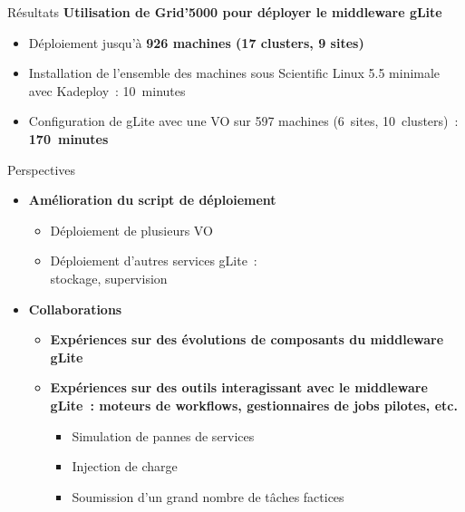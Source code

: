\documentclass[10pt,final,usepdftitle=false,handout]{beamer}
\begin{document}
\begin{frame}{Résultats}
	\textbf{Utilisation de Grid'5000 pour déployer le middleware gLite}
\begin{itemize}
	\item Déploiement jusqu'à \textbf{926 machines (17 clusters, 9 sites)}
		\bigskip
\item Installation de l'ensemble des machines sous Scientific Linux 5.5 minimale avec Kadeploy~: 10~minutes
		\bigskip
\item Configuration de gLite avec une VO sur 597 machines (6~sites, 10~clusters)~: \textbf{170~minutes}
\end{itemize}
	\end{frame}

	\begin{frame}{Perspectives}
	\begin{itemize}
		\item \textbf{Amélioration du script de déploiement}
		\begin{itemize}
		\item Déploiement de plusieurs VO
		\item Déploiement d'autres services gLite~:\\ stockage, supervision
		\bigskip
			\end{itemize}
		\item \textbf{Collaborations}
		\smallskip
			\begin{itemize}
				\item \textbf{Expériences sur des évolutions de composants du middleware gLite}
		\medskip
				\item \textbf{Expériences sur des outils interagissant avec le middleware gLite~: moteurs de workflows, gestionnaires de jobs pilotes, etc.}
					\begin{itemize}
						\item Simulation de pannes de services
						\item Injection de charge
						\item Soumission d'un grand nombre de tâches factices
					\end{itemize}
			\end{itemize}
	\end{itemize}
	\end{frame}
\end{document}
